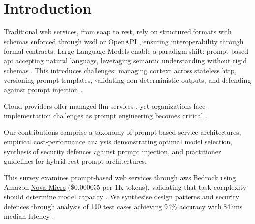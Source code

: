 \section{Introduction}

Traditional web services, from \gls{soap} to \gls{rest}, rely on structured formats with schemas enforced through \gls{wsdl} or OpenAPI \cite{FIELDING_2000, OPENAI_SPEC_3_2_0}, ensuring interoperability through formal contracts. Large Language Models enable a paradigm shift: prompt-based \gls{api} accepting natural language, leveraging semantic understanding without rigid schemas \cite{BROWN_2020, VASWANI_2017}. This introduces challenges: managing context across stateless \gls{http}, versioning prompt templates, validating non-deterministic outputs, and defending against prompt injection \cite{OWASP_2025, LERCHER_2024}.

Cloud providers offer managed \gls{llm} services \cite{AWS_BEDROCK}, yet organizations face implementation challenges as prompt engineering becomes critical \cite{SAHOO_2025, WHITE_2025}.

Our contributions comprise a taxonomy of prompt-based service architectures, empirical cost-performance analysis demonstrating optimal model selection, synthesis of security defences against prompt injection, and practitioner guidelines for hybrid \gls{rest}-prompt architectures.

This survey examines prompt-based web services through \gls{aws} \href{https://aws.amazon.com/bedrock/}{Bedrock} using Amazon \href{https://docs.aws.amazon.com/bedrock/latest/userguide/model-card-amazon-nova-micro.html}{Nova Micro} (\$0.000035 per 1K tokens), validating that task complexity should determine model capacity \cite{AWS_NOVA}. We synthesise design patterns and security defences through analysis of 100 test cases achieving 94\% accuracy with 847ms median latency \cite{AWS_BEDROCK, CHEN_2025}.
